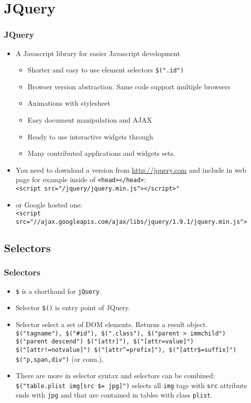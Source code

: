 \documentclass[trans,compress,xcolor=table]{beamer}
\begin{document}
\section{JQuery}
\begin{frame}
\frametitle{JQuery}
\begin{itemize}
\item A Javascript library for easier Javascript development
\begin{itemize}
\item Shorter and easy to use element selectors \lstinline!$(".id")!
\item Browser version abstraction. Same code support multiple browsers
\item Animations with stylesheet
\item Easy document manipulation and AJAX
\item Ready to use interactive widgets through  
\item Many contributed applications and widgets sets.
\end{itemize}
\item You need to download a version from \url{http://jquery.com} and
	include in web page for example inside of \lstinline!<head></head>!:\\
	\lstinline!<script src="/jquery/jquery.min.js"></script>"!
\item or Google hosted one:\\
	\lstinline!<script src="//ajax.googleapis.com/ajax/libs/jquery/1.9.1/jquery.min.js">!
\end{itemize}
\end{frame}

\subsection*{Selectors}
\begin{frame}[fragile]
\frametitle{Selectors}
\begin{itemize}
\item \lstinline!$! is a shorthand for \lstinline!jQuery!.
\item Selector \lstinline!$()! is entry point of JQuery.
\item Selector select a set of DOM elements. Returns a result object.\\
	\lstinline!$("tagname"), $("#id"), $(".class"), $("parent > immchild")!\\
	\lstinline!$("parent descend") $("[attr]"), $("[attr=value]") !\\
	\lstinline{$("[attr!=notvalue]") $("[attr^=prefix]"), $("[attr$=suffix]") }\\
	\lstinline{$("p,span,div")} (or conn.), 
\item There are more in selector syntax and selectors can be combined:\\
\lstinline!$("table.plist img[src $= jpg]")! selects all \lstinline!img! tags
	with \lstinline!src! attribute ends with \lstinline!jpg! and that
	are contained in tables with class \lstinline!plist!.
\end{itemize}
\end{frame}
\end{document}
